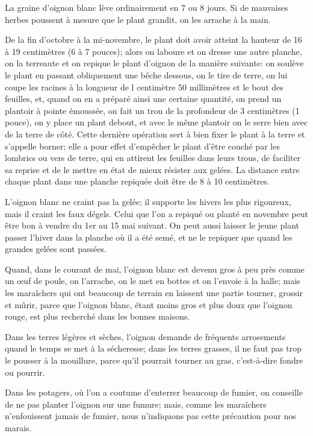 \documentclass[10pt,a4paper]{book}
\begin{document}
La graine d'oignon blanc lève ordinairement en 7 ou 8 jours. Si de mauvaises herbes poussent à mesure que le plant grandit, on les arrache à la main.

De la fin d'octobre à la mi-novembre, le plant doit avoir atteint la hauteur de 16 à 19 centimètres (6 à 7 pouces); alors on laboure et on dresse une autre planche, on la terreaute et on repique le plant d'oignon de la manière suivante: on soulève le plant en passant obliquement une bêche dessous, on le tire de terre, on lui coupe les racines à la longueur de l centimètre 50 millimètres et le bout des feuilles, et, quand on en a préparé ainsi une certaine quantité, on prend un plantoir à pointe émoussée, on fait un trou de la profondeur de 3 centimètres (1 pouce), on y place un plant debout, et avec le même plantoir on le serre bien avec de la terre de côté. Cette dernière opération sert à bien fixer le plant à la terre et s'appelle borner; elle a pour effet d'empêcher le plant d'être couché par les lombrics ou vers de terre, qui en attirent les feuilles dans leurs trous, de faciliter sa reprise et de le mettre en état de mieux résister aux gelées. La distance entre chaque plant dans une planche repiquée doit être de 8 à 10 centimètres.

L'oignon blanc ne craint pas la gelée; il supporte les hivers les plus rigoureux, mais il craint les faux dégels. Celui que l'on a repiqué ou planté en novembre peut être bon à vendre du 1er au 15 mai suivant. On peut aussi laisser le jeune plant passer l'hiver dans la planche où il a été semé, et ne le repiquer que quand les grandes gelées sont passées.

Quand, dans le courant de mai, l'oignon blanc est devenu gros à peu près comme un œuf de poule, on l'arrache, on le met en bottes et on l'envoie à la halle; mais les maraîchers qui ont beaucoup de terrain en laissent une partie tourner, grossir et mûrir, parce que l'oignon blanc, étant moins gros et plus doux que l'oignon rouge, est plus recherché dans les bonnes maisons.

Dans les terres légères et sèches, l'oignon demande de fréquents arrosements quand le temps se met à la sécheresse; dans les terres grasses, il ne faut pas trop le pousser à la mouillure, parce qu'il pourrait tourner au gras, c'est-à-dire fondre ou pourrir.

Dans les potagers, où l'on a coutume d'enterrer beaucoup de fumier, on conseille de ne pas planter l'oignon sur une fumure; mais, comme les maraîchers n'enfouissent jamais de fumier, nous n'indiquons pas cette précaution pour nos marais.
\end{document}
